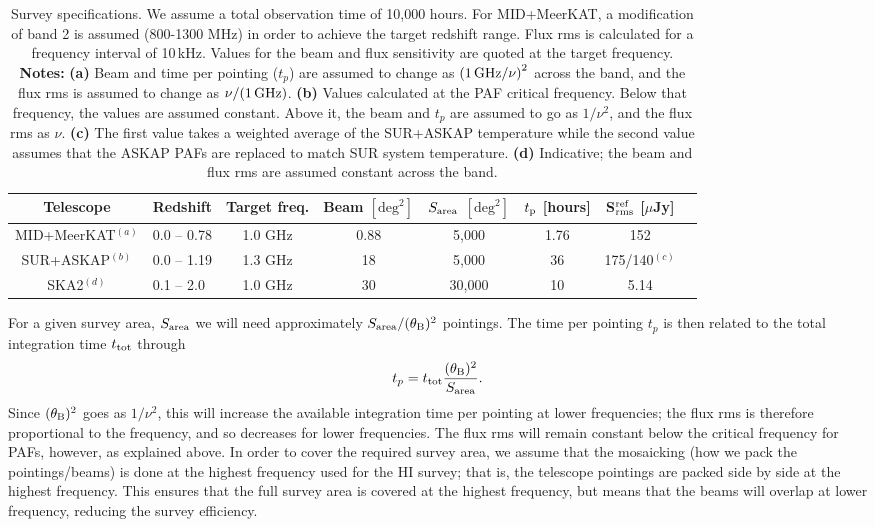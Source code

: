 \documentclass[useAMS,usenatbib]{mn2e}
\begin{document}
\begin{table}
\begin{center}
{\renewcommand{\arraystretch}{1.5} \begin{tabular}{cccccccc}
\hline
 Telescope & Redshift & Target freq. & Beam $[\mathrm{deg}^2]$ & $S_{\rm area}$ $[\mathrm{deg}^2]$ & $t_{\rm p}$ [hours] & S$^{\rm ref}_{\rm rms}$ [$\mu$Jy]\\
\hline
MID+MeerKAT$^{(a)}$ & 0.0 -- 0.78 & 1.0 GHz & 0.88 & 5,000 & 1.76 & 152\\
SUR+ASKAP$^{(b)}$ & 0.0 -- 1.19 & 1.3 GHz & 18 & 5,000 & 36 & 175/140$^{(c)}$\\
\hline
SKA2$^{(d)}$ & 0.1 -- 2.0~ & 1.0 GHz & 30 & 30,000 & 10 & 5.14\\
\hline
\end{tabular} }
\end{center}
\caption[x]{Survey specifications. We assume a total observation time of 10,000 hours. For MID+MeerKAT, a modification of band 2 is assumed (800-1300 MHz) in order to achieve the target redshift range.
Flux rms is calculated for a frequency interval of 10\,kHz. 
Values for the beam and flux sensitivity are quoted at the target frequency. \\
{\bf Notes:} {\bf (a)} Beam and time per pointing ($t_p$) are assumed to change as $\left(1\, {\rm GHz}/\nu\right)^2$ across the band, and the flux rms is assumed to change as $\nu/(1\, {\rm GHz})$.
{\bf (b)} Values calculated at the PAF critical frequency. Below that frequency, the values are assumed constant. Above it, the beam and $t_p$ are assumed to go as $1/\nu^2$, and the flux rms as $\nu$.
{\bf (c)} The first value takes a weighted average of the SUR+ASKAP temperature while the second value assumes that the ASKAP PAFs are replaced to match SUR system temperature.
{\bf (d)} Indicative; the beam and flux rms are assumed constant across the band.}
\label{tab:surveys}
\end{table}

For a given survey area, $S_{\rm area}$ we will need approximately $S_{\rm area}/(\theta_{\rm B})^2$ pointings. The time per pointing $t_p$ is then related to the total integration time $t_{\rm tot}$ through
\begin{equation}
t_p=t_{\rm tot} \frac{(\theta_{\rm B})^2}{S_{\rm area}}.
\end{equation}
Since $(\theta_{\rm B})^2$ goes as $1/\nu^2$, this will increase the available integration time per pointing at lower frequencies; the flux rms is therefore proportional to the frequency, and so decreases for lower frequencies. The flux rms will remain constant below the critical frequency for PAFs, however, as explained above.
In order to cover the required survey area, we assume that the mosaicking (how we pack the pointings/beams) is done at the highest frequency used for the HI survey; that is, the telescope pointings are packed side by side at the highest frequency. This ensures that the full survey area is covered at the highest frequency, but means that the beams will overlap at lower frequency, reducing the survey efficiency.
\end{document}

